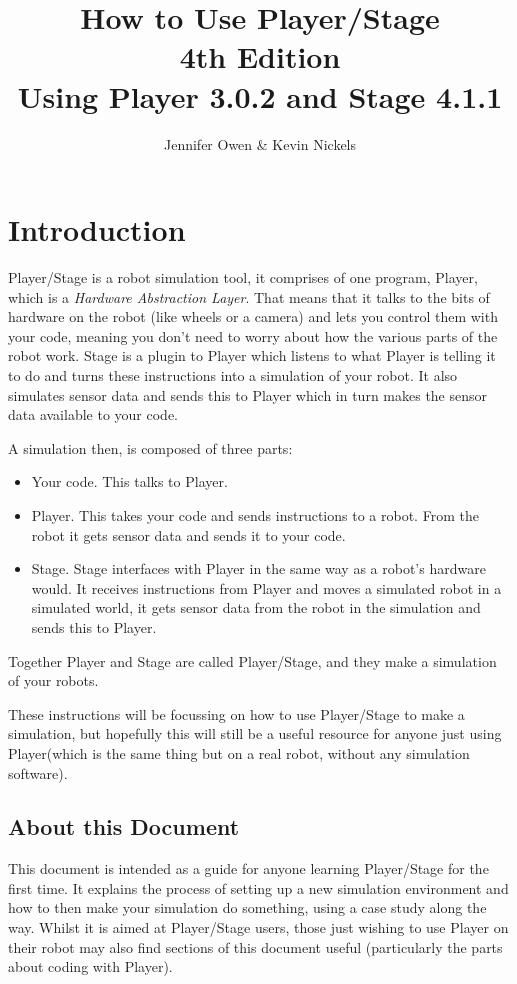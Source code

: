 \documentclass[a4paper]{report}
\title{How to Use Player/Stage\\ 
\large 4th Edition \\
\small Using Player 3.0.2 and Stage 4.1.1}
\author{Jennifer Owen \& Kevin Nickels}
\newcommand{\plst}{Player/Stage\xspace}
\newcommand{\pl}{Player\xspace}
\begin{document}
\maketitle

\tableofcontents



\chapter{Introduction}\label{sec:Introduction}
\plst is a robot simulation tool, it comprises of one program, \pl, which is a \emph{Hardware Abstraction Layer}. That means that it talks to the bits of hardware on the robot (like wheels or a camera) and lets you control them with your code, meaning you don't need to worry about how the various parts of the robot work. 
Stage is a plugin to \pl which listens to what \pl is telling it to do and turns these instructions into a simulation of your robot. It also simulates sensor data and sends this to \pl which in turn makes the sensor data available to your code.

A simulation then, is composed of three parts:
\begin{itemize}
\item Your code. This talks to \pl.
\item \pl. This takes your code and sends instructions to a robot. From the robot it gets sensor data and sends it to your code.
\item Stage. Stage interfaces with \pl in the same way as a robot's hardware would. It receives instructions from \pl and moves a simulated robot in a simulated world, it gets sensor data from the robot in the simulation and sends this to \pl.
\end{itemize}
Together \pl and Stage are called \plst, and they make a simulation of your robots.

These instructions will be focussing on how to use \plst to make a simulation, but hopefully this will still be a useful resource for anyone just using \pl (which is the same thing but on a real robot, without any simulation software).

\section{About this Document}
This document is intended as a guide for anyone learning \plst for the first time. It explains the process of setting up a new simulation environment and how to then make your simulation do something, using a case study along the way. Whilst it is aimed at \plst users, those just wishing to use \pl on their robot may also find sections of this document useful (particularly the parts about coding with Player).
\end{document}
